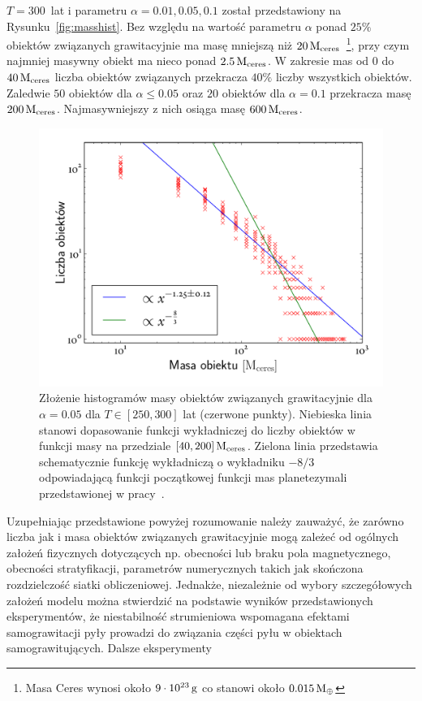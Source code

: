 $T=300$~lat i parametru $\alpha = 0.01, 0.05, 0.1$ został przedstawiony na
Rysunku~\ref{fig:masshist}. Bez względu na wartość parametru $\alpha$ ponad
$25\%$ obiektów związanych grawitacyjnie ma masę mniejszą niż
$20\hbox{$\mathrm{\thinspace M_{\textrm{ceres}}}$}$~\footnote{Masa Ceres wynosi około $9\cdot10^{23}\hbox{$\thinspace\textrm{g}$}$ co stanowi około
$0.015\hbox{$\mathrm{\thinspace M_{\oplus}}$}$}, przy czym najmniej masywny obiekt ma nieco ponad $2.5\hbox{$\mathrm{\thinspace M_{\textrm{ceres}}}$}$.
W zakresie mas od $0$ do $40\hbox{$\mathrm{\thinspace M_{\textrm{ceres}}}$}$ liczba obiektów związanych przekracza
$40\%$ liczby wszystkich obiektów. Zaledwie $50$ obiektów dla $\alpha \leq
0.05$ oraz $20$ obiektów dla $\alpha = 0.1$ przekracza masę $200\hbox{$\mathrm{\thinspace M_{\textrm{ceres}}}$}$.
Najmasywniejszy z nich osiąga masę $600\hbox{$\mathrm{\thinspace M_{\textrm{ceres}}}$}$.
%
\begin{figure}[ht]
   \centering
   \includegraphics[width=0.7\linewidth]{figures/mass_func}
   \caption{Złożenie histogramów masy obiektów związanych grawitacyjnie dla
   $\alpha = 0.05$ dla $T \in [250, 300]$ lat (czerwone punkty). Niebieska linia
stanowi dopasowanie funkcji wykładniczej do liczby obiektów w funkcji masy na
przedziale $[40,200]\hbox{$\mathrm{\thinspace M_{\textrm{ceres}}}$}$. Zielona linia przedstawia schematycznie funkcję
wykładniczą o wykładniku $-8/3$ odpowiadającą funkcji początkowej funkcji mas
planetezymali przedstawionej w pracy~\cite{MFFK98}.}
   \label{fig:massfun}
\end{figure}
\par Uzupełniając przedstawione powyżej rozumowanie należy zauważyć, że zarówno liczba
jak i masa obiektów związanych grawitacyjnie mogą zależeć od ogólnych założeń
fizycznych dotyczących np. obecności lub braku pola magnetycznego, obecności
stratyfikacji, parametrów numerycznych takich jak skończona rozdzielczość
siatki obliczeniowej. Jednakże, niezależnie od wybory szczegółowych założeń
modelu można stwierdzić na podstawie wyników przedstawionych eksperymentów, że
niestabilność strumieniowa wspomagana efektami samograwitacji pyły prowadzi do
związania części pyłu w obiektach samograwitujących. Dalsze eksperymenty
